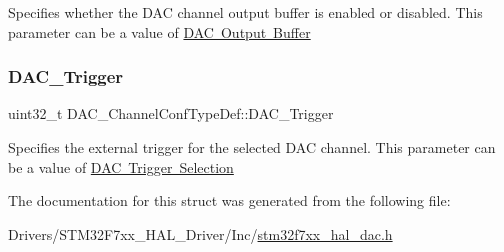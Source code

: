 Specifies whether the D\+AC channel output buffer is enabled or disabled. This parameter can be a value of \mbox{\hyperlink{group___d_a_c__output__buffer}{D\+AC Output Buffer}} \mbox{\label{struct_d_a_c___channel_conf_type_def_afe5fa571464a45c9e1cc3315ad8afd83}} 
\subsubsection{\texorpdfstring{DAC\_Trigger}{DAC\_Trigger}}
{\footnotesize\ttfamily uint32\+\_\+t D\+A\+C\+\_\+\+Channel\+Conf\+Type\+Def\+::\+D\+A\+C\+\_\+\+Trigger}

Specifies the external trigger for the selected D\+AC channel. This parameter can be a value of \mbox{\hyperlink{group___d_a_c__trigger__selection}{D\+AC Trigger Selection}} 

The documentation for this struct was generated from the following file\+:\begin{DoxyCompactItemize}
\item 
Drivers/\+S\+T\+M32\+F7xx\+\_\+\+H\+A\+L\+\_\+\+Driver/\+Inc/\mbox{\hyperlink{stm32f7xx__hal__dac_8h}{stm32f7xx\+\_\+hal\+\_\+dac.\+h}}\end{DoxyCompactItemize}
